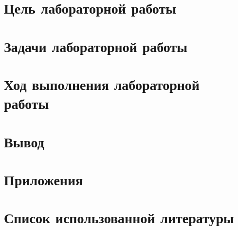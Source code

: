 \documentclass[14pt]{extarticle}
\begin{document}
\newpage
{}

\section*{Цель лабораторной работы}


\vspace{0.5cm}

\section*{Задачи лабораторной работы}


\newpage
\section*{Ход выполнения лабораторной работы\\}
	
	
\newpage
\section*{Вывод}


\newpage
\section*{Приложения}


\newpage
\section*{Список использованной литературы}

\end{document}
